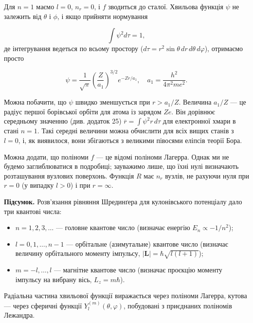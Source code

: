 \documentclass{article}
\begin{document}
Для $n=1$ маємо $l=0$, $n_r=0$, і $f$ зводиться до сталої. Хвильова функція $\psi$ не залежить від $\theta$ і $\phi$, і якщо прийняти нормування

\begin{equation}
\int \psi^2 d\tau = 1,
\end{equation}
%
де інтегрування ведеться по всьому простору ($d\tau = r^2\sin\theta\, dr\, d\theta\, d\varphi$), отримаємо просто

\begin{equation}
\psi = \frac{1}{\sqrt{\pi}} \left( \frac{Z}{a_1} \right)^{3/2} e^{-Z r / a_1}, \quad a_1 = \frac{h^2}{4 \pi^2 m e^2}.
\end{equation}

Можна побачити, що $\psi$ швидко зменшується при $r > a_1/Z$. Величина $a_1/Z$ --- це радіус першої борівської орбіти для атома із зарядом $Ze$.
%
Він дорівнює середньому значенню (див. додаток 25) $\overline{r} = \int \psi^2 r\, d\tau$ для електронної хмари в стані $n=1$. Такі середні величини можна обчислити для всіх вищих станів з $l=0$, і, як виявилося, вони збігаються з великими півосями еліпсів теорії Бора.

Можна додати, що поліноми $f$ --- це відомі поліноми Лагерра. Однак ми не будемо заглиблюватися в подробиці; зауважимо лише, що їхні нулі визначають розташування вузлових поверхонь. Функція $R$ має $n_r$ вузлів, не рахуючи нуля при $r=0$ (у випадку $l>0$) і при $r=\infty$.

\begin{note}
\textbf{Підсумок.} Розв'язання рівняння Шрединґера для кулонівського потенціалу дало три квантові числа:
\begin{itemize}
    \item $n = 1, 2, 3, \dots$ --- головне квантове число (визначає енергію $E_n \propto -1/n^2$);
    \item $l = 0, 1, \dots, n-1$ --- орбітальне (азимутальне) квантове число (визначає величину орбітального моменту імпульсу, $|\mathbf{L}|=\hbar\sqrt{l(l+1)}$);
    \item $m = -l, \dots, l$ --- магнітне квантове число (визначає проєкцію моменту імпульсу на вибрану вісь, $L_z = m\hbar$).
\end{itemize}
Радіальна частина хвильової функції виражається через поліноми Лагерра, кутова --- через сферичні функції $Y_l^{(m)}(\theta,\varphi)$, побудовані з приєднаних поліномів Лежандра.
\end{note}
\end{document}
